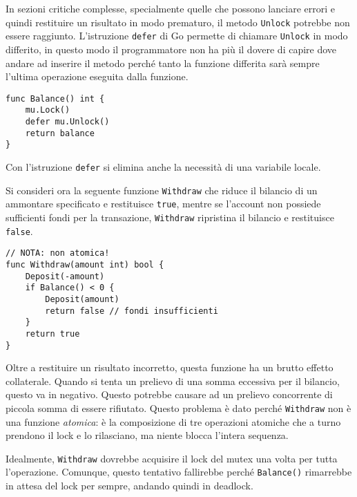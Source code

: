\documentclass[../../thesis.tex]{subfiles}
\begin{document}
    In sezioni critiche complesse, specialmente quelle che possono lanciare errori e quindi restituire un risultato in modo prematuro, il metodo \verb"Unlock" potrebbe non essere raggiunto.
    L'istruzione \verb"defer" di Go permette di chiamare \verb"Unlock" in modo differito, in questo modo il programmatore non ha più il dovere di capire dove andare ad inserire il metodo perché tanto la funzione differita sarà sempre l'ultima operazione eseguita dalla funzione.
    \begin{lstlisting}[frame = single,label={lst:lstlisting9-2.3}]
func Balance() int {
    mu.Lock()
    defer mu.Unlock()
    return balance
}
    \end{lstlisting}
    Con l'istruzione \verb"defer" si elimina anche la necessità di una variabile locale.
    \hfill \vspace{12pt}

    Si consideri ora la seguente funzione \verb"Withdraw" che riduce il bilancio di un ammontare specificato e restituisce \verb"true", mentre se l'account non possiede sufficienti fondi per la transazione, \verb"Withdraw" ripristina il bilancio e restituisce \verb"false".
    \begin{lstlisting}[frame = single,label={lst:lstlisting9-2.4}]
// NOTA: non atomica!
func Withdraw(amount int) bool {
    Deposit(-amount)
    if Balance() < 0 {
        Deposit(amount)
        return false // fondi insufficienti
    }
    return true
}
    \end{lstlisting}
    Oltre a restituire un risultato incorretto, questa funzione ha un brutto effetto collaterale.
    Quando si tenta un prelievo di una somma eccessiva per il bilancio, questo va in negativo.
    Questo potrebbe causare ad un prelievo concorrente di piccola somma di essere rifiutato.
    Questo problema è dato perché \verb"Withdraw" non è una funzione \textit{atomica}: è la composizione di tre operazioni atomiche che a turno prendono il lock e lo rilasciano, ma niente blocca l'intera sequenza.
    \hfill \vspace{12pt}

    Idealmente, \verb"Withdraw" dovrebbe acquisire il lock del mutex una volta per tutta l'operazione.
    Comunque, questo tentativo fallirebbe perché \verb"Balance()" rimarrebbe in attesa del lock per sempre, andando quindi in deadlock.
    \hfill \vspace{12pt}
\end{document}
